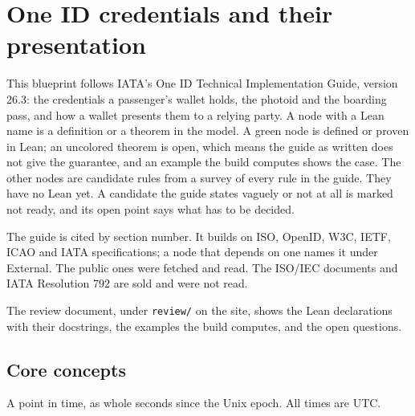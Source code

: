 %
%

\chapter{One ID credentials and their presentation}

This blueprint follows IATA's One ID Technical Implementation Guide, version
26.3: the credentials a passenger's wallet holds, the photoid and the boarding
pass, and how a wallet presents them to a relying party.  A node with a Lean
name is a definition or a theorem in the model.  A green node is defined or
proven in Lean; an uncolored theorem is open, which means the guide as written
does not give the guarantee, and an example the build computes shows the case.
The other nodes are candidate rules from a survey of every rule in the guide.
They have no Lean yet.  A candidate the guide states vaguely or not at all is
marked not ready, and its open point says what has to be decided.

The guide is cited by section number.  It builds on ISO, OpenID, W3C, IETF,
ICAO and IATA specifications; a node that depends on one names it under
External.  The public ones were fetched and read.  The ISO/IEC documents and
IATA Resolution 792 are sold and were not read.

The review document, under \texttt{review/} on the site, shows the Lean
declarations with their docstrings, the examples the build computes, and the
open questions.

\section{Core concepts}

\begin{definition}[Instant]
  \label{def:instant}
  A point in time, as whole seconds since the Unix epoch.  All times are UTC.
\end{definition}

